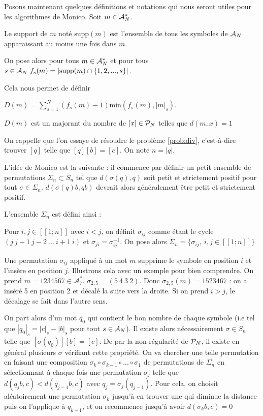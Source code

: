 Posons maintenant quelques définitions et notations qui nous seront utiles pour les algorithmes de Monico. Soit $m \in \A$.
\begin{definition}[support]
	Le support de $m$ noté $\text{supp}(m)$ est l'ensemble de tous les symboles de $\AN$ apparaissant au moins une fois dans $m$.
\end{definition}
\begin{definition} \label{def:f}
	On pose alors pour tous $m \in \A$ et pour tous $s \in \AN\ {f_s(m) = |\text{supp}(m) \cap \{1,2,...,s\}|}$.
\end{definition} 
Cela nous permet de définir
\begin{definition} \label{def:D}
	$D(m) = \displaystyle\sum_{s=1}^N(f_s(m)-1)\textrm{min}(f_s(m), |m|_s)$.
\end{definition}
\begin{property} \label{prop:D}
	$D(m)$ est un majorant du  nombre de $[x] \in \P$ telles que $d(m,x)=1$
\end{property}

On rappelle que l'on essaye de résoudre le problème \ref{prob:div}, c'est-à-dire trouver $[q]$ telle que $[q][b]=[c]$. On note $n=|q|$.

L'idée de Monico est la suivante : il commence par définir un petit ensemble de permutations $\Sigma_n \subset S_n$ tel que $d(\sigma(q),q)$ soit petit et strictement positif pour tout $\sigma \in \Sigma_n$. $d(\sigma(q)b,qb)$ devrait alors généralement être petit et strictement positif. 

L'ensemble $\Sigma_n$ est défini ainsi : 
\begin{definition}[$\Sigma_n$] \label{def:Sigma_n}
	Pour $i,j \in [\![1;n]\!]$ avec $i<j$, on définit $\sigma_{ij}$ comme étant le cycle $(j\ j\!-\!1\ j\!-\!2\ ...\ i\!+\!1\ i)$ et $\sigma_{ji}=\sigma_{ij}^{-1}$. On pose alors $\Sigma_n=\{\sigma_{ij},\ i,j \in [\![1;n]\!]\}$
\end{definition}

Une permutation $\sigma_{ij}$ appliqué à un mot $m$ supprime le symbole en position $i$ et l'insère en position $j$. Illustrons cela avec un exemple pour bien comprendre. On prend $m=\text{1234567} \in \mathcal{A}_7^*$. $\sigma_{2,5}=(5\ 4\ 3\ 2)$. Donc $\sigma_{2,5}(m)=\text{1523467}$ : on a inséré 5 en position 2 et décalé la suite vers la droite. Si on prend $i>j$, le décalage se fait dans l'autre sens.

On part alors d'un mot $q_0$ qui contient le bon nombre de chaque symbole (i.e tel que $|q_0|_s = |c|_s-|b|_s$ pour tout $s \in \AN$). Il existe alors nécessairement $\sigma \in S_n$ telle que $[\sigma(q_0)][b]=[c]$. De par la non-régularité de $\P$, il existe en général plusieurs $\sigma$ vérifiant cette propriété. On va chercher une telle permutation en faisant une composition $\sigma_k \circ \sigma_{k-1} \circ ... \circ \sigma_1$ de permutations de $\Sigma_n$ en sélectionnant à chaque fois une permutation $\sigma_j$ telle que $d(q_jb, c) < d(q_{j-1}b, c)$ avec $q_j = \sigma_j(q_{j-1})$. Pour cela, on choisit aléatoirement une permutation $\sigma_k$ jusqu'à en trouver une qui diminue la distance puis on l'applique à $q_{k-1}$, et on recommence jusqu'à avoir $d(\sigma_kb,c)=0$

